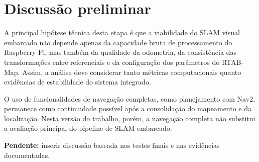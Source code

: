 \section{Discussão preliminar}

A principal hipótese técnica desta etapa é que a viabilidade do SLAM visual embarcado não depende apenas da capacidade bruta de processamento do Raspberry Pi, mas também da qualidade da odometria, da consistência das transformações entre referenciais e da configuração dos parâmetros do RTAB-Map. Assim, a análise deve considerar tanto métricas computacionais quanto evidências de estabilidade do sistema integrado.

O uso de funcionalidades de navegação completas, como planejamento com Nav2, permanece como continuidade possível após a consolidação do mapeamento e da localização. Nesta versão do trabalho, porém, a navegação completa não substitui a avaliação principal do pipeline de SLAM embarcado.

\noindent\textbf{Pendente:} inserir discussão baseada nos testes finais e nas evidências documentadas.
